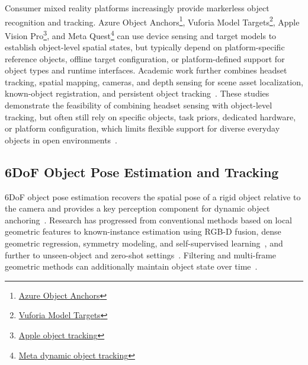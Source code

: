 \documentclass[review]{vgtc}
\begin{document}
Consumer mixed reality platforms increasingly provide markerless object recognition and tracking. Azure Object Anchors\footnote{\href{https://learn.microsoft.com/en-us/dynamics365/mixed-reality/guides/pc-app-anchor-object}{Azure Object Anchors}}, Vuforia Model Targets\footnote{\href{https://developer.vuforia.com/library/vuforia-engine/images-and-objects/model-targets/model-targets/}{Vuforia Model Targets}}, Apple Vision Pro\footnote{\href{https://developer.apple.com/documentation/visionos/implementing-object-tracking-in-your-app}{Apple object tracking}}, and Meta Quest\footnote{\href{https://developers.meta.com/horizon/documentation/native/android/mobile-dynamic-object-tracker/}{Meta dynamic object tracking}} can use device sensing and target models to establish object-level spatial states, but typically depend on platform-specific reference objects, offline target configuration, or platform-defined support for object types and runtime interfaces. Academic work further combines headset tracking, spatial mapping, cameras, and depth sensing for scene asset localization, known-object registration, and persistent object tracking~\cite{fan2021assettracking,doughty2022hmdegopose,pollabauer2023hololens,martingomez2024sttar,trojak2025mixedpose,greene2025markerless,trojak2026markerless,gbot2024}. These studies demonstrate the feasibility of combining headset sensing with object-level tracking, but often still rely on specific objects, task priors, dedicated hardware, or platform configuration, which limits flexible support for diverse everyday objects in open environments~\cite{hurt2025surrealitycv}.

\subsection{6DoF Object Pose Estimation and Tracking}

6DoF object pose estimation recovers the spatial pose of a rigid object relative to the camera and provides a key perception component for dynamic object anchoring~\cite{aguirrezabal2026survey}. Research has progressed from conventional methods based on local geometric features to known-instance estimation using RGB-D fusion, dense geometric regression, symmetry modeling, and self-supervised learning~\cite{densefusion2019,epos2020,gdrnet2021,self6d2020}, and further to unseen-object and zero-shot settings~\cite{gen6d2022,megapose2022,lin2024sam6d,ornek2024foundpose,moon2025coop,foundationpose2024}. Filtering and multi-frame geometric methods can additionally maintain object state over time~\cite{poserbpf2021,bundletrack2021}.
\end{document}
